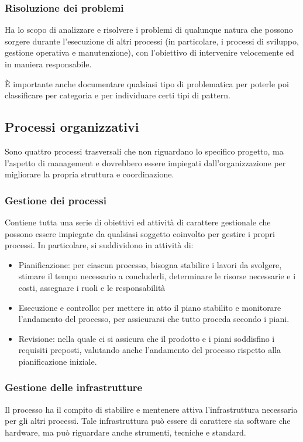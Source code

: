 \subsubsection{Risoluzione dei problemi}
Ha lo scopo di analizzare e risolvere i problemi di qualunque natura che possono sorgere durante l'esecuzione di altri processi (in particolare, i processi di sviluppo, gestione operativa e manutenzione), con l'obiettivo di intervenire velocemente ed in maniera responsabile.
\par È importante anche documentare qualsiasi tipo di problematica per poterle poi classificare per categoria e per individuare certi tipi di pattern.

\subsection{Processi organizzativi}
Sono quattro processi trasversali che non riguardano lo specifico progetto, ma l'aspetto di management e dovrebbero essere impiegati dall'organizzazione per migliorare la propria struttura e coordinazione.
\subsubsection{Gestione dei processi}
Contiene tutta una serie di obiettivi ed attività di carattere gestionale che possono essere impiegate da qualsiasi soggetto coinvolto per gestire i propri processi. In particolare, si suddividono in attività di:
\begin{itemize}
    \item Pianificazione: per ciascun processo, bisogna stabilire i lavori da svolgere, stimare il tempo necessario a concluderli, determinare le risorse necessarie e i costi, assegnare i ruoli e le responsabilità
    \item Esecuzione e controllo: per mettere in atto il piano stabilito e monitorare l'andamento del processo, per assicurarsi che tutto proceda secondo i piani.
    \item Revisione: nella quale ci si assicura che il prodotto e i piani soddisfino i requisiti preposti, valutando anche l'andamento del processo rispetto alla pianificazione iniziale.
\end{itemize}
\subsubsection{Gestione delle infrastrutture}
Il processo ha il compito di stabilire e mentenere attiva l'infrastruttura necessaria per gli altri processi. Tale infrastruttura può essere di carattere sia software che hardware, ma può riguardare anche strumenti, tecniche e standard.
